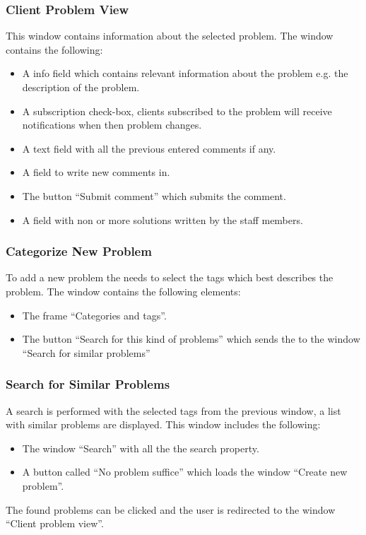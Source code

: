 \subsubsection{Client Problem View}
This window contains information about the selected problem. The window contains the following:
\begin{itemize}
	\item A info field which contains relevant information about the problem e.g. the description of the problem.
	\item A subscription check-box, clients subscribed to the problem will receive notifications when then problem changes. 
	\item A text field with all the previous entered comments if any.
	\item A field to write new comments in.
	\item The button ``Submit comment'' which submits the comment.
	\item A field with non or more solutions written by the staff members.  
\end{itemize}



\subsubsection{Categorize New Problem}
To add a new problem the \aclient[] needs to select the tags which best describes the problem. The window contains the following elements:
\begin{itemize}
	\item The frame ``Categories and tags''.
	\item The button ``Search for this kind of problems'' which sends the \aclient[] to the window ``Search for similar problems''
\end{itemize}

\subsubsection{Search for Similar Problems}
A search is performed with the selected tags from the previous window, a list with similar problems are displayed. This window includes the following: 
\begin{itemize}
	\item The window ``Search'' with all the the search property.
	\item A button called ``No problem suffice'' which loads the window ``Create new problem''.
\end{itemize}
The found problems can be  clicked and the user is redirected to  the window ``Client problem view''. 

